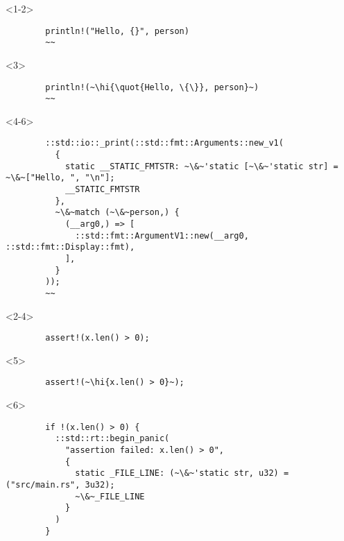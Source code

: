\documentclass[usepdftitle=false]{beamer}
\renewcommand{\&}{\makebox[\widthof{\ampersand}][c]{\scalebox{0.9}[1.0]{\Book\ampersand}}}
\newcommand{\+}{\makebox[\widthof{+}][c]{\raisebox{-.2\height}{\scalefont{1.5}\Light+}}}
\newcommand{\hi}[1]{%
\tikz[baseline=(A.base)]
 \node[highlighting=0,inner sep=0pt,text depth=0pt] (A) {#1};%
}
\newcommand{\quot}[1]{''#1''}
\begin{document}
\begin{frame}[fragile]
  \begin{minipage}[t][0.4\textheight][b]{\textwidth}
    \begin{onlyenv}<1-2>
      \begin{verbatim}
        println!("Hello, {}", person)
        ~~
      \end{verbatim}
    \end{onlyenv}
    \begin{onlyenv}<3>
      \begin{verbatim}
        println!(~\hi{\quot{Hello, \{\}}, person}~)
        ~~
      \end{verbatim}
    \end{onlyenv}
    \begin{onlyenv}<4-6>
      \begin{verbatim}
        ::std::io::_print(::std::fmt::Arguments::new_v1(
          {
            static __STATIC_FMTSTR: ~\&~'static [~\&~'static str] = ~\&~["Hello, ", "\n"];
            __STATIC_FMTSTR
          },
          ~\&~match (~\&~person,) {
            (__arg0,) => [
              ::std::fmt::ArgumentV1::new(__arg0, ::std::fmt::Display::fmt),
            ],
          }
        ));
        ~~
      \end{verbatim}
    \end{onlyenv}
  \end{minipage}
  \begin{minipage}[t][0.4\textheight][t]{\textwidth}
    \begin{onlyenv}<2-4>
      \begin{verbatim}
        assert!(x.len() > 0);
      \end{verbatim}
    \end{onlyenv}
    \begin{onlyenv}<5>
      \vspace{-2ex}
      \begin{verbatim}
        assert!(~\hi{x.len() > 0}~);
      \end{verbatim}
    \end{onlyenv}
    \begin{onlyenv}<6>
      \vspace{-1.5ex}
      \begin{verbatim}
        if !(x.len() > 0) {
          ::std::rt::begin_panic(
            "assertion failed: x.len() > 0",
            {
              static _FILE_LINE: (~\&~'static str, u32) = ("src/main.rs", 3u32);
              ~\&~_FILE_LINE
            }
          )
        }
      \end{verbatim}
    \end{onlyenv}
  \end{minipage}
\end{frame}
\end{document}
